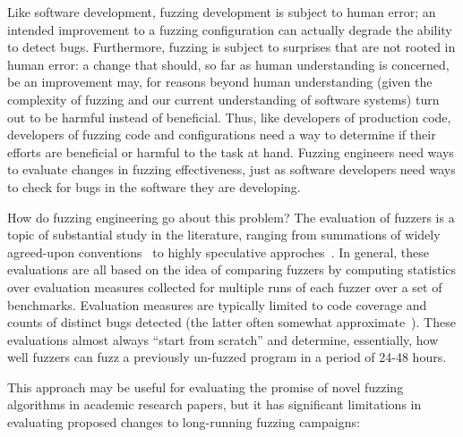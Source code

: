Like software development, fuzzing development is subject to human error; an intended improvement to a fuzzing configuration can actually degrade the ability to detect bugs.  Furthermore, fuzzing is subject to surprises that are not rooted in human error: a change that should, so far as human understanding is concerned, be an improvement may, for reasons beyond human understanding (given the complexity of fuzzing and our current understanding of software systems) turn out to be harmful instead of beneficial.  Thus, like developers of production code, developers of fuzzing code and configurations need a way to determine if their efforts are beneficial or harmful to the task at hand.  Fuzzing engineers need ways to evaluate changes in fuzzing effectiveness, just as software developers need ways to check for bugs in the software they are developing.

How do fuzzing engineering go about this problem?  The evaluation of fuzzers is a topic of substantial study in the literature, ranging from summations of widely agreed-upon conventions~\cite{Hicks18} to highly speculative approches~\cite{FuzzAppeal}.  In general, these evaluations are all based on the idea of comparing fuzzers by computing statistics over evaluation measures collected for multiple runs of each fuzzer over a set of benchmarks.  Evaluation measures are typically limited to code coverage and counts of distinct bugs detected (the latter often somewhat approximate~\cite{PLDI13}).  These evaluations almost always ``start from scratch'' and determine, essentially, how well fuzzers can fuzz a previously un-fuzzed program in a period of 24-48 hours.

  This approach may be useful for evaluating the promise of novel fuzzing algorithms in academic research papers, but it has significant limitations in evaluating proposed changes to long-running fuzzing campaigns:


